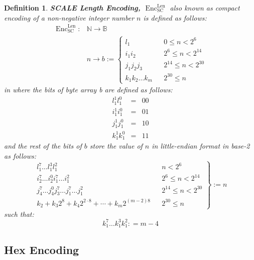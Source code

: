 \documentclass{article}
\newcommand{\assign}{:=}
\newcommand{\cdummy}{\cdot}
\newcommand{\nosymbol}{}
\newcommand{\tmop}[1]{\ensuremath{\operatorname{#1}}}
\newcommand{\tmstrong}[1]{\textbf{#1}}
\newcommand{\tmtextbf}[1]{{\bfseries{#1}}}
\newtheorem{definition}{Definition}
\providecommand{\cdummy}{{\cdot}}
\providecommand{\nosymbol}{}
\providecommand{\tmop}[1]{\ensuremath{\mathrm{#1}}}
\providecommand{\tmstrong}[1]{\tmtextbf{#1}}
\providecommand{\tmtextbf}[1]{\tmtextbf{#1}}
\newtheorem{definition}{Definition}
\begin{document}
\begin{definition}
  \label{defn-sc-len-encoding}{\tmstrong{SCALE Length Encoding,
  $\tmop{Enc}^{\tmop{Len}}_{\tmop{SC}}$}} also known as compact encoding of a
  non-negative integer number $n$ is defined as follows:
  \[ \begin{array}{ll}
       \tmop{Enc}^{\tmop{Len}}_{\tmop{SC}} : & \mathbb{N} \rightarrow
       \mathbb{B}\\
       & n \rightarrow b \assign \left\{ \begin{array}{lll}
         l^{\nosymbol}_1 &  & 0 \leqslant n < 2^6\\
         i^{\nosymbol}_1 i^{\nosymbol}_2 &  & 2^6 \leqslant n < 2^{14}\\
         j^{\nosymbol}_1 j^{\nosymbol}_2 j_3 &  & 2^{14} \leqslant n <
         2^{30}\\
         k_1^{\nosymbol} k_2^{\nosymbol} \ldots k_m^{\nosymbol}  &  & 2^{30}
         \leqslant n
       \end{array} \right.
     \end{array} \]
  in where the bits of byte array b are defined as follows:
  \[ \begin{array}{lcc}
       l^1_1 l_1^0 & = & 00\\
       i^1_1 i_1^0 & = & 01\\
       j^1_1 j_1^0 & = & 10\\
       k^1_1 k_1^0 & = & 11
     \end{array} \]
  and the rest of the bits of $b$ store the value of $n$ in little-endian
  format in base-2 as follows:
  \[ \left. \begin{array}{lll}
       l^7_1 \ldots l^3_1 l^2_1 &  & n < 2^6\\
       i_2^7 \ldots i_2^0 i_1^7 \ldots i^2_1^{\nosymbol} &  & 2^6 \leqslant n
       < 2^{14}\\
       j_4^7 \ldots j_4^0 j_3^7 \ldots j_1^7 \ldots j^2_1 &  & 2^{14}
       \leqslant n < 2^{30}\\
       k_2 + k_3 2^8 + k_4 2^{2 \cdummy 8} + \cdots + k_m 2^{(m - 2) 8} &  &
       2^{30} \leqslant n
     \end{array} \right\} \assign n \]
  such that:
  \[ k^7_1 \ldots k^3_1 k^2_1 : = m - 4 \]
\end{definition}

\subsection{Hex Encoding}
\end{document}
